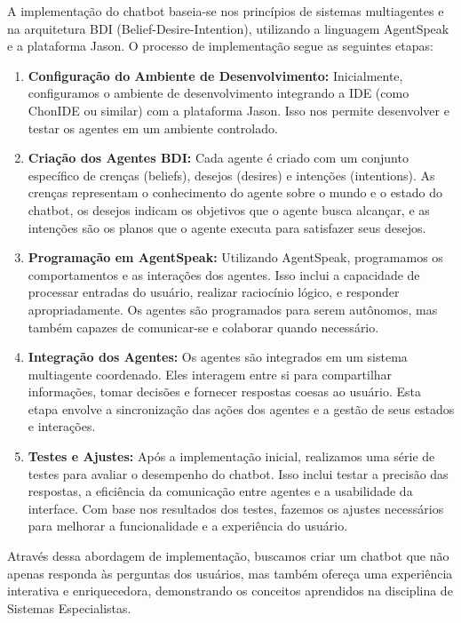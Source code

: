 \documentclass[12pt]{article}
\begin{document}
    A implementação do chatbot baseia-se nos princípios de sistemas multiagentes e na arquitetura BDI (Belief-Desire-Intention), utilizando a linguagem AgentSpeak e a plataforma Jason. O processo de implementação segue as seguintes etapas:

    \begin{enumerate}
        \item \textbf{Configuração do Ambiente de Desenvolvimento:} Inicialmente, configuramos o ambiente de desenvolvimento integrando a IDE (como ChonIDE ou similar) com a plataforma Jason. Isso nos permite desenvolver e testar os agentes em um ambiente controlado.

        \item \textbf{Criação dos Agentes BDI:} Cada agente é criado com um conjunto específico de crenças (beliefs), desejos (desires) e intenções (intentions). As crenças representam o conhecimento do agente sobre o mundo e o estado do chatbot, os desejos indicam os objetivos que o agente busca alcançar, e as intenções são os planos que o agente executa para satisfazer seus desejos.

        \item \textbf{Programação em AgentSpeak:} Utilizando AgentSpeak, programamos os comportamentos e as interações dos agentes. Isso inclui a capacidade de processar entradas do usuário, realizar raciocínio lógico, e responder apropriadamente. Os agentes são programados para serem autônomos, mas também capazes de comunicar-se e colaborar quando necessário.

        \item \textbf{Integração dos Agentes:} Os agentes são integrados em um sistema multiagente coordenado. Eles interagem entre si para compartilhar informações, tomar decisões e fornecer respostas coesas ao usuário. Esta etapa envolve a sincronização das ações dos agentes e a gestão de seus estados e interações.

        \item \textbf{Testes e Ajustes:} Após a implementação inicial, realizamos uma série de testes para avaliar o desempenho do chatbot. Isso inclui testar a precisão das respostas, a eficiência da comunicação entre agentes e a usabilidade da interface. Com base nos resultados dos testes, fazemos os ajustes necessários para melhorar a funcionalidade e a experiência do usuário.

    \end{enumerate}

    Através dessa abordagem de implementação, buscamos criar um chatbot que não apenas responda às perguntas dos usuários, mas também ofereça uma experiência interativa e enriquecedora, demonstrando os conceitos aprendidos na disciplina de Sistemas Especialistas.
\end{document}
